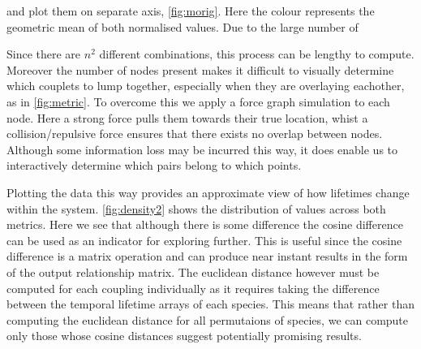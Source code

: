and plot them on separate axis, \autoref{fig:morig}. Here the colour represents the geometric mean of both normalised values. Due to the large number of 




Since there are $n^2$ different combinations, this process can be lengthy to compute. Moreover the number of nodes present makes it difficult to visually determine which couplets to lump together, especially when they are overlaying eachother, as in \autoref{fig:metric}. To overcome this we apply a force graph simulation to each node. Here a strong force pulls them towards their true location, whist a collision/repulsive force ensures that there exists no overlap between nodes. Although some information loss may be incurred this way, it does enable us to interactively determine which pairs belong to which points.   

Plotting the data this way provides an approximate view of how lifetimes change within the system. \autoref{fig:density2} shows the distribution of values across both metrics. Here we see that although there is some difference the cosine difference can be used as an indicator for exploring further. This is useful since the cosine difference is a matrix operation and can produce near instant results in the form of the output relationship matrix. The euclidean distance however must be computed for each coupling individually as it requires taking the difference between the temporal lifetime arrays of each species. This means that rather than computing the euclidean distance for all permutaions of species, we can compute only those whose cosine distances suggest potentially promising results.  




